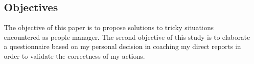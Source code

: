 \subsection{Objectives}
\label{subsec:objectives}


The objective of this paper is to propose solutions to tricky situations encountered as people manager. The second objective of this study is to elaborate a questionnaire based on my personal decision in coaching my direct reports in order to validate the correctness of my actions.